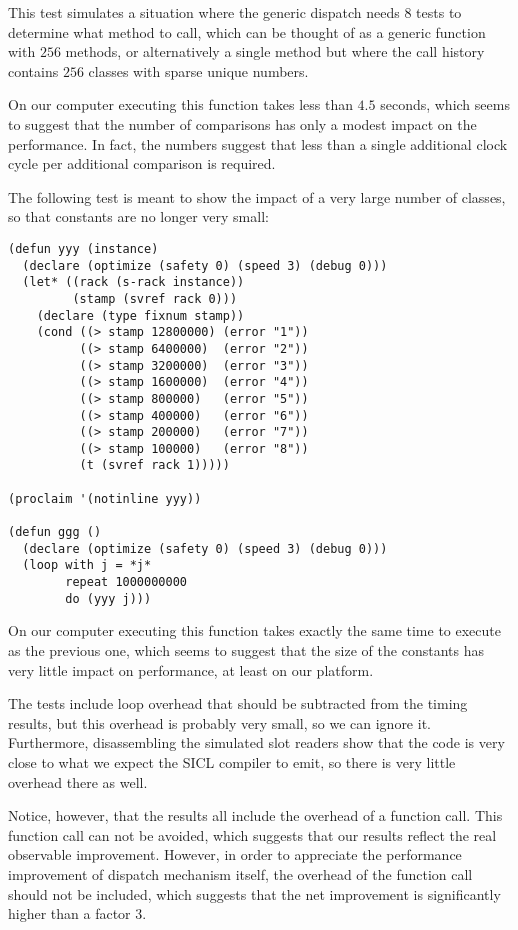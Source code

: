 This test simulates a situation where the generic dispatch needs $8$
tests to determine what method to call, which can be thought of as a
generic function with $256$ methods, or alternatively a single method
but where the call history contains $256$ classes with sparse unique
numbers. 

On our computer executing this function takes less than $4.5$ seconds,
which seems to suggest that the number of comparisons has only a
modest impact on the performance.  In fact, the numbers suggest that
less than a single additional clock cycle per additional comparison is
required. 

The following test is meant to show the impact of a very large number
of classes, so that constants are no longer very small:

\begin{verbatim}
(defun yyy (instance)
  (declare (optimize (safety 0) (speed 3) (debug 0)))
  (let* ((rack (s-rack instance))
         (stamp (svref rack 0)))
    (declare (type fixnum stamp))
    (cond ((> stamp 12800000) (error "1"))
          ((> stamp 6400000)  (error "2"))
          ((> stamp 3200000)  (error "3"))
          ((> stamp 1600000)  (error "4"))
          ((> stamp 800000)   (error "5"))
          ((> stamp 400000)   (error "6"))
          ((> stamp 200000)   (error "7"))
          ((> stamp 100000)   (error "8"))
          (t (svref rack 1)))))

(proclaim '(notinline yyy))

(defun ggg ()
  (declare (optimize (safety 0) (speed 3) (debug 0)))
  (loop with j = *j*
        repeat 1000000000
        do (yyy j)))
\end{verbatim}

On our computer executing this function takes exactly the same time to
execute as the previous one, which seems to suggest that the size of
the constants has very little impact on performance, at least on our
platform.

The tests include loop overhead that should be subtracted from the
timing results, but this overhead is probably very small, so we can
ignore it.  Furthermore, disassembling the simulated slot readers show
that the code is very close to what we expect the SICL compiler to
emit, so there is very little overhead there as well.  

Notice, however, that the results all include the overhead of a
function call.  This function call can not be avoided, which suggests
that our results reflect the real observable improvement.  However,
in order to appreciate the performance improvement of dispatch
mechanism itself, the overhead of the function call should not be
included, which suggests that the net improvement is significantly
higher than a factor $3$. 



